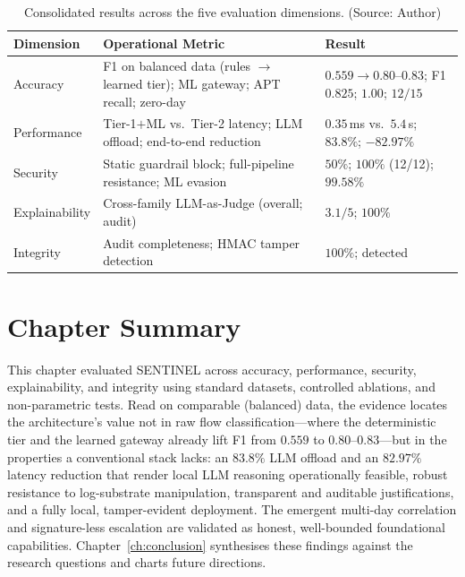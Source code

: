 \begin{table}[!htbp]
    \centering
    \caption{Consolidated results across the five evaluation dimensions. (Source: Author)}
    \label{tab:5d_summary}
    \begin{tabular}{|>{\raggedright\arraybackslash}p{}|>{\raggedright\arraybackslash}p{}|>{\raggedright\arraybackslash}p{}|}
        \hline
        \textbf{Dimension} & \textbf{Operational Metric} & \textbf{Result} \\ \hline
        Accuracy & F1 on balanced data (rules $\rightarrow$ learned tier); ML gateway; APT recall; zero-day & $0.559 \rightarrow 0.80$--$0.83$; F1 $0.825$; $1.00$; $12/15$ \\ \hline
        Performance & Tier-1$+$ML vs.\ Tier-2 latency; LLM offload; end-to-end reduction & $0.35$\,ms vs.\ $5.4$\,s; $83.8\%$; $-82.97\%$ \\ \hline
        Security & Static guardrail block; full-pipeline resistance; ML evasion & $50\%$; $100\%$ (12/12); $99.58\%$ \\ \hline
        Explainability & Cross-family LLM-as-Judge (overall; audit) & $3.1/5$; $100\%$ \\ \hline
        Integrity & Audit completeness; HMAC tamper detection & $100\%$; detected \\ \hline
    \end{tabular}
\end{table}

\section{Chapter Summary}
This chapter evaluated SENTINEL across accuracy, performance, security, explainability, and integrity using standard datasets, controlled ablations, and non-parametric tests. Read on comparable (balanced) data, the evidence locates the architecture's value not in raw flow classification---where the deterministic tier and the learned gateway already lift F1 from $0.559$ to $0.80$--$0.83$---but in the properties a conventional stack lacks: an $83.8\%$ LLM offload and an $82.97\%$ latency reduction that render local LLM reasoning operationally feasible, robust resistance to log-substrate manipulation, transparent and auditable justifications, and a fully local, tamper-evident deployment. The emergent multi-day correlation and signature-less escalation are validated as honest, well-bounded foundational capabilities. Chapter~\ref{ch:conclusion} synthesises these findings against the research questions and charts future directions.
